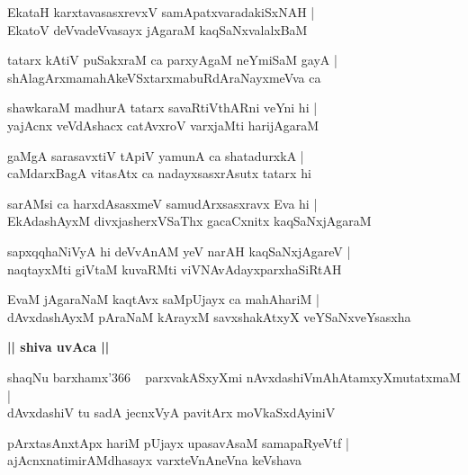 \documentclass[twoside,12pt,openright]{book}
\newcounter{shloka}[chapter]
\def\uvaca#1{\centerline{{\large\textbf{#1}}}}
\begin{document}
\begin{shloka}%
EkataH karxtavasasxrevxV samApatxvaradakiSxNAH |\\
EkatoV deVvadeVvasayx jAgaraM kaqSaNxvalalxBaM
\end{shloka}

\begin{shloka}%
tatarx kAtiV puSakxraM ca parxyAgaM neYmiSaM gayA |\\
shAlagArxmamahAkeVSxtarxmabuRdAraNayxmeVva ca
\end{shloka}

\begin{shloka}%
shawkaraM madhurA tatarx savaRtiVthARni veYni hi |\\
yajAcnx veVdAshacx catAvxroV varxjaMti harijAgaraM
\end{shloka}

\begin{shloka}%
gaMgA sarasavxtiV tApiV yamunA ca shatadurxkA |\\
caMdarxBagA vitasAtx ca nadayxsasxrAsutx tatarx hi
\end{shloka}

\begin{shloka}%
sarAMsi ca harxdAsasxmeV samudArxsasxravx Eva hi |\\
EkAdashAyxM divxjasherxVSaThx gacaCxnitx kaqSaNxjAgaraM
\end{shloka}

\begin{shloka}%
sapxqqhaNiVyA hi deVvAnAM yeV narAH kaqSaNxjAgareV |\\
naqtayxMti giVtaM kuvaRMti viVNAvAdayxparxhaSiRtAH
\end{shloka}

\begin{shloka}%
EvaM jAgaraNaM kaqtAvx saMpUjayx ca mahAhariM |\\
dAvxdashAyxM pAraNaM kArayxM savxshakAtxyX veYSaNxveYsasxha
\end{shloka}

\uvaca{|| shiva uvAca ||}

\begin{shloka}%
shaqNu barxhamx\char'366 ~ parxvakASxyXmi nAvxdashiVmAhAtamxyXmutatxmaM |\\
dAvxdashiV tu sadA jecnxVyA pavitArx moVkaSxdAyiniV
\end{shloka}

\begin{shloka}%
pArxtasAnxtApx hariM pUjayx upasavAsaM samapaRyeVtf |\\
ajAcnxnatimirAMdhasayx varxteVnAneVna keVshava
\end{shloka}
\end{document}
